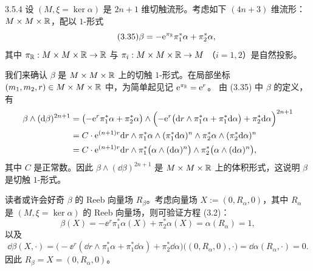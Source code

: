 \begin{wexam}{3.5.4}
设 $(M,\xi=\ker\alpha)$ 是 $2n+1$ 维切触流形。考虑如下
$(4n+3)$ 维流形：$M\times M\times\mathbb{R}$，配以 $1$-形式
\begin{equation}\tag{3.35}
  \beta=-\mathrm{e}^{\pi_{\mathbb{R}}}\pi_1^*\alpha+\pi_2^*\alpha,
\end{equation}
其中 $\pi_{\mathbb{R}}:M\times M\times\mathbb{R}\to\mathbb{R}$ 与 $\pi_i:M\times M\times\mathbb{R}\to M$
（$i=1,2$）是自然投影。

我们来确认 $\beta$ 是 $M\times M\times\mathbb{R}$ 上的切触 $1$-形式。在局部坐标
$(m_1,m_2,r)\in M\times M\times\mathbb{R}$ 中，为简单起见记 $\mathrm{e}^{\pi_{\mathbb{R}}}=\mathrm{e}^r$。
由 (3.35) 中 $\beta$ 的定义，有
\begin{align*}
  \beta\wedge(\mathrm{d}\beta)^{2n+1}
  &=\bigl(-\mathrm{e}^r\pi_1^*\alpha+\pi_2^*\alpha\bigr)
   \wedge\Bigl(-\mathrm{e}^r\bigl(\mathrm{d} r\wedge\pi_1^*\alpha+\pi_1^*\mathrm{d}\alpha\bigr)
   +\pi_2^*\mathrm{d}\alpha\Bigr)^{2n+1}\\
  &=C\cdot\mathrm{e}^{(n+1)r}\mathrm{d} r\wedge\pi_1^*\alpha
   \wedge(\pi_1^*\mathrm{d}\alpha)^n\wedge\pi_2^*\alpha
   \wedge(\pi_2^*\mathrm{d}\alpha)^n\\
  &=C\cdot\mathrm{e}^{(n+1)r}\mathrm{d} r\wedge\pi_1^*\bigl(\alpha\wedge(\mathrm{d}\alpha)^n\bigr)
   \wedge\pi_2^*\bigl(\alpha\wedge(\mathrm{d}\alpha)^n\bigr),
\end{align*}
其中 $C$ 是正常数。因此 $\beta\wedge(\dd\beta)^{2n+1}$ 是
$M\times M\times\mathbb{R}$ 上的体积形式，这说明 $\beta$ 是切触 $1$-形式。

读者或许会好奇 $\beta$ 的 Reeb 向量场 $R_\beta$。考虑向量场
$X:=(0,R_\alpha,0)$，其中 $R_\alpha$ 是 $(M,\xi=\ker\alpha)$ 的 Reeb
向量场，则可验证方程 (3.2)：
\[
  \beta(X)=-\ee^r\pi_1^*\alpha(X)+\pi_2^*\alpha(X)
  =\alpha(R_\alpha)=1,
\]
以及
\[
  \dd\beta(X,\cdot)
  =\bigl(-\ee^r(\dd r\wedge\pi_1^*\alpha+\pi_1^*\dd\alpha)
   +\pi_2^*\dd\alpha\bigr)\bigl((0,R_\alpha,0),\cdot\bigr)
  =\dd\alpha(R_\alpha,\cdot)=0 .
\]
因此 $R_\beta=X=(0,R_\alpha,0)$。


\end{wexam}
